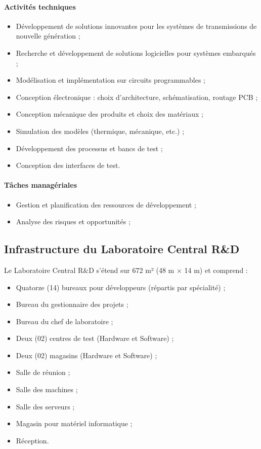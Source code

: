 \documentclass[12pt,a4paper,oneside]{report}
\begin{document}
\paragraph{Activités techniques}
\begin{itemize}
    \item Développement de solutions innovantes pour les systèmes de transmissions de nouvelle génération ;
    \item Recherche et développement de solutions logicielles pour systèmes embarqués ;
    \item Modélisation et implémentation sur circuits programmables ;
    \item Conception électronique : choix d'architecture, schématisation, routage PCB ;
    \item Conception mécanique des produits et choix des matériaux ;
    \item Simulation des modèles (thermique, mécanique, etc.) ;
    \item Développement des processus et bancs de test ;
    \item Conception des interfaces de test.
\end{itemize}

\paragraph{Tâches managériales}
\begin{itemize}
    \item Gestion et planification des ressources de développement ;
    \item Analyse des risques et opportunités ;
\end{itemize}

\subsection{Infrastructure du Laboratoire Central R\&D}
\label{subsec:infra_labo}

Le Laboratoire Central R\&D s’étend sur 672 m² (48 m $\times$ 14 m) et comprend :
\begin{itemize}
    \item Quatorze (14) bureaux pour développeurs (répartis par spécialité) ;
    \item Bureau du gestionnaire des projets ;
    \item Bureau du chef de laboratoire ;
    \item Deux (02) centres de test (Hardware et Software) ;
    \item Deux (02) magasins (Hardware et Software) ;
    \item Salle de réunion ;
    \item Salle des machines ;
    \item Salle des serveurs ;
    \item Magasin pour matériel informatique ;
    \item Réception.
\end{itemize}
\end{document}
